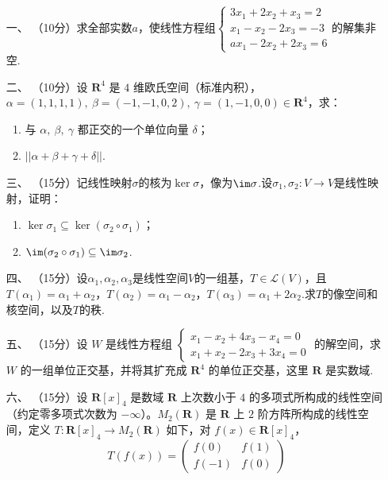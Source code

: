 \begin{enumerate}
	\item[一、]（10分）求全部实数$a$，使线性方程组$\begin{cases}
        3x_1+2x_2+x_3=2 \\ x_1-x_2-2x_3=-3 \\ ax_1-2x_2+2x_3=6
    \end{cases}$的解集非空.
	\item[二、]（10分）设 $\mathbf{R}^4$ 是 $4$ 维欧氏空间（标准内积），$\alpha=(1,1,1,1),\ \beta=(-1,-1,0,2),\ \gamma=(1,-1,0,0) \in \mathbf{R}^4$，求：
    \begin{enumerate}[label=(\arabic*)]
        \item 与 $\alpha,\ \beta,\ \gamma$ 都正交的一个单位向量 $\delta$；
        \item $||\alpha+\beta+\gamma+\delta||$.
    \end{enumerate}
	\item[三、]（15分）记线性映射$\sigma$的核为$\ker\sigma$，像为$\im\sigma$.设$\sigma_1,\sigma_2:V\to V$是线性映射，证明：
	\begin{enumerate}[label=(\arabic*)]
        \item $\ker\sigma_1\subseteq\ker(\sigma_2\circ\sigma_1)$；
        \item $\im(\sigma_2\circ\sigma_1)\subseteq\im\sigma_2$.
    \end{enumerate}
	\item[四、]（15分）设$\alpha_1,\alpha_2,\alpha_3$是线性空间$V$的一组基，$T\in\mathcal{L}(V)$，且$T(\alpha_1)=\alpha_1+\alpha_2$，$T(\alpha_2)=\alpha_1-\alpha_2$，$T(\alpha_3)=\alpha_1+2\alpha_2$.求$T$的像空间和核空间，以及$T$的秩.
	\item[五、]（15分）设 $W$ 是线性方程组 $\begin{cases}
        x_1-x_2+4x_3-x_4=0 \\ x_1+x_2-2x_3+3x_4=0
    \end{cases}$ 的解空间，求 $W$ 的一组单位正交基，并将其扩充成 $\mathbf{R}^4$ 的单位正交基，这里 $\mathbf{R}$ 是实数域.
	\item[六、]（15分）设 $\mathbf{R}[x]_4$ 是数域 $\mathbf{R}$ 上次数小于 $4$ 的多项式所构成的线性空间（约定零多项式次数为 $-\infty$）。$M_2(\mathbf{R})$ 是 $\mathbf{R}$ 上 $2$ 阶方阵所构成的线性空间，定义 $T : \mathbf{R}[x]_4 \to M_2(\mathbf{R})$ 如下，对 $f(x) \in \mathbf{R}[x]_4$，
    \[T(f(x))=\begin{pmatrix}f(0) & f(1) \\ f(-1) & f(0)\end{pmatrix}\]

\end{enumerate}
